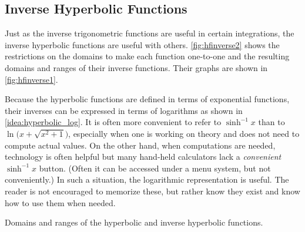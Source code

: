 \subsection{Inverse Hyperbolic Functions}

Just as the inverse trigonometric functions are useful in certain integrations, the inverse hyperbolic functions are useful with others. \autoref{fig:hfinverse2} shows the restrictions on the domains to make each function one-to-one and the resulting domains and ranges of their inverse functions. Their graphs are shown in \autoref{fig:hfinverse1}.

Because the hyperbolic functions are defined in terms of exponential functions, their inverses can be expressed in terms of logarithms as shown in \autoref{idea:hyperbolic_log}. It is often more convenient to refer to $\sinh^{-1}x$ than to $\ln\bigl(x+\sqrt{x^2+1}\bigr)$, especially when one is working on theory and does not need to compute actual values. On the other hand, when computations are needed, technology is often helpful but many hand-held calculators lack a \emph{convenient} $\sinh^{-1}x$ button. (Often it can be accessed under a menu system, but not conveniently.) In such a situation, the logarithmic representation is useful. The reader is not encouraged to memorize these, but rather know they exist and know how to use them when needed.

\noindent\begin{minipage}[t]{\linewidth}\noindent%
\captionsetup{type=figure}%
\flushinner{%
\small
\begin{tabular}{lcc @{\hspace{2em}} ccc}
Function & Domain & Range & Function & Domain & Range \\ \cmidrule(r{2em}){1-3} \cmidrule(l{-1em}){4-6}
$\cosh x$ & $[0,\infty)$ & $[1,\infty)$ &
 $\cosh^{-1} x$ & $[1,\infty)$ & $[0,\infty)$ \\
$\sinh x$ & $(-\infty,\infty)$ & $(-\infty,\infty)$ &
 $\sinh^{-1} x$ & $(-\infty,\infty)$ & $(-\infty,\infty)$\\
$\tanh x$ & $(-\infty,\infty)$ & $(-1,1)$ &
 $\tanh^{-1} x$ & $(-1,1)$ & $(-\infty,\infty)$\\
$\sech x$ & $[0,\infty)$ & $(0,1]$ & $\sech^{-1} x$ & $(0,1]$ & $[0,\infty)$\\
$\csch x$ & $(-\infty,0) \cup (0,\infty)$ & $(-\infty,0) \cup (0,\infty)$ &
 $\csch^{-1} x$ & $(-\infty,0) \cup (0,\infty)$ & $(-\infty,0) \cup (0,\infty)$\\
$\coth x$ & $(-\infty,0) \cup (0,\infty)$ & $(-\infty,-1) \cup (1,\infty)$ &
 $\coth^{-1} x$ & $(-\infty,-1) \cup (1,\infty)$ & $(-\infty,0) \cup (0,\infty)$
\end{tabular}}
\caption{Domains and ranges of the hyperbolic and inverse hyperbolic functions.}
\label{fig:hfinverse2}
\end{minipage}

